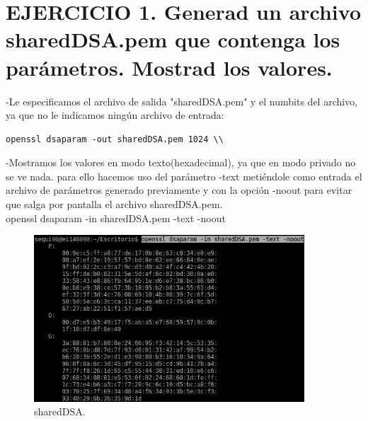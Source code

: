 

\section{EJERCICIO 1. Generad un archivo sharedDSA.pem que contenga los parámetros. Mostrad los valores. }

-Le especificamos el archivo de salida "sharedDSA.pem" y el numbits del archivo, ya que no le indicamos
ningún archivo de entrada: \\

\begin{lstlisting}
openssl dsaparam -out sharedDSA.pem 1024 \\
\end{lstlisting}

-Mostramos los valores en modo texto(hexadecimal), ya que en modo privado no se ve nada.
para ello hacemos uso del parámetro -text metiéndole como entrada el archivo de parámetros 
generado previamente y con la opción -noout para evitar que salga por pantalla el
archivo sharedDSA.pem. \\

openssl dsaparam -in sharedDSA.pem -text -noout

\begin{figure}[h]
	\centering
	\includegraphics[width=0.9\textwidth]{imagenes/sharedDSA}
	\caption{sharedDSA.}
\end{figure}

\newpage


